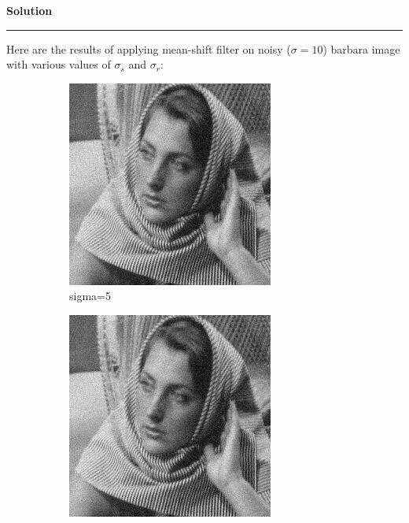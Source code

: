 \documentclass[a4paper]{article}
\newenvironment{solution}[2][]{%
    \begin{mdframed}[linecolor=green!60!black, linewidth=2pt, roundcorner=10pt, backgroundcolor=green!5!white, skipabove=12pt, skipbelow=12pt]%
        \textbf{\large #2} %
        \par\noindent\rule{\textwidth}{0.4pt} %
        \vspace{0.5em} %
}{%
    \end{mdframed}%
}
\begin{document}
\begin{solution}{Solution}
Here are the results of applying mean-shift filter on noisy ($\sigma = 10$) barbara image with various values of $\sigma_s$ and $\sigma_r$:
\begin{figure}[H]
    \centering
    \begin{subfigure}[b]{0.24\textwidth}
        \centering
        \includegraphics[width=\textwidth]{../images/noisy_barbara256_sigma_10.png}
        \caption{sigma=5}
        \label{Noisy }
    \end{subfigure}
    \begin{subfigure}[b]{0.24\textwidth}
        \centering
        \includegraphics[width=\textwidth]{../images/filtered_barbara256_meanshift_sigma_10_sigma_s_2_sigma_r_2.png}

\end{subfigure}
\end{figure}
\end{solution}
\end{document}
